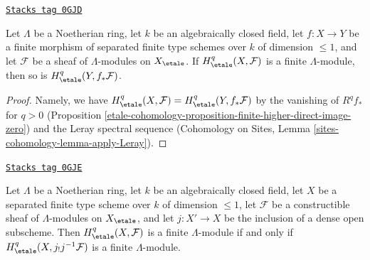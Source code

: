 \begin{lemma}
\label{etale-cohomology-lemma-finite-pushforward-coefficients}
\href{https://stacks.math.columbia.edu/tag/0GJD}{\texttt{Stacks tag 0GJD}}

Let $\Lambda$ be a Noetherian ring, let $k$ be an algebraically closed field,
let $f : X \to Y$ be a finite morphism of separated finite type schemes
over $k$ of dimension $\leq 1$, and let $\mathcal{F}$ be a sheaf
of $\Lambda$-modules on $X_\etale$. If
$H^q_\etale(X, \mathcal{F})$ is a finite $\Lambda$-module, then
so is $H^q_\etale(Y, f_*\mathcal{F})$.
\end{lemma}

\begin{proof}
Namely, we have $H^q_\etale(X, \mathcal{F}) = H^q_\etale(Y, f_*\mathcal{F})$
by the vanishing of $R^qf_*$ for $q > 0$
(Proposition \ref{etale-cohomology-proposition-finite-higher-direct-image-zero}) and
the Leray spectral sequence
(Cohomology on Sites, Lemma \ref{sites-cohomology-lemma-apply-Leray}).
\end{proof}

\begin{lemma}
\label{etale-cohomology-lemma-restrict-to-open-coefficients}
\href{https://stacks.math.columbia.edu/tag/0GJE}{\texttt{Stacks tag 0GJE}}

Let $\Lambda$ be a Noetherian ring, let $k$ be an algebraically closed field,
let $X$ be a separated finite type scheme over $k$ of dimension $\leq 1$,
let $\mathcal{F}$ be a constructible sheaf of $\Lambda$-modules on $X_\etale$,
and let $j : X' \to X$ be the inclusion of a dense open subscheme. Then
$H^q_\etale(X, \mathcal{F})$ is a finite $\Lambda$-module if and only if
$H^q_\etale(X, j_!j^{-1}\mathcal{F})$ is a finite $\Lambda$-module.
\end{lemma}

